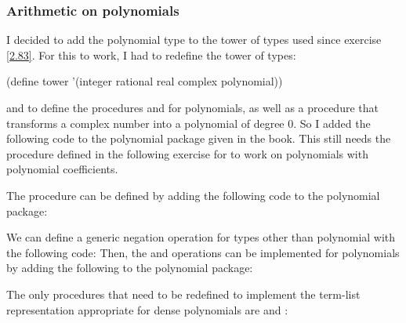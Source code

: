 \subsubsection{Arithmetic on polynomials}

\begin{comp}
    I decided to add the polynomial type to the tower of types used since 
    exercise \ref{2.83}. For this to work, I had to redefine the tower of types:
    \begin{cscm}
        (define tower '(integer rational real complex polynomial))
    \end{cscm}
    and to define the procedures  and  for polynomials, 
    as well as a  procedure that transforms a complex number into 
    a polynomial of degree 0. So I added the following code to the polynomial 
    package given in the book. This still needs the  procedure 
    defined in the following exercise for  to work on polynomials 
    with polynomial coefficients.
\end{comp}

\begin{exe}[2.87]
    The  procedure can be defined by adding the following code to 
    the polynomial package:
\end{exe}

\begin{exe}[2.88]
    We can define a generic negation operation  for types other than 
    polynomial with the following code:
    Then, the  and  operations can be implemented for 
    polynomials by adding the following to the polynomial package:
\end{exe}

\begin{exe}[2.89]
    The only procedures that need to be redefined to implement the term-list 
    representation appropriate for dense polynomials are  and 
    :
\end{exe}


